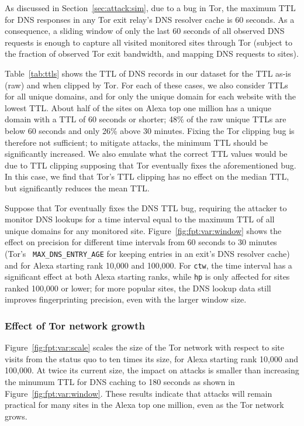 As discussed in Section~\ref{sec:attack:sim}, due to a bug in Tor, the
maximum TTL for DNS responses in any Tor exit relay's DNS resolver cache
is 60 seconds. As a consequence, a sliding window of only the last 60
seconds of all observed DNS requests is enough to capture all visited
monitored sites through Tor (subject to the fraction of observed Tor
exit bandwidth, and mapping DNS requests to sites).

Table~\ref{tab:ttls} shows the TTL of DNS records in our dataset for the
TTL as-is (raw) and when clipped by Tor.  For each of these cases, we
also consider TTLs for all unique domains, and for only the unique
domain for each website with the lowest TTL.  About half of the sites on
Alexa top one million has a unique domain with a TTL of 60 seconds or
shorter; 48\% of the raw unique TTLs are below 60 seconds and only 26\%
above 30 minutes. Fixing the Tor clipping bug is therefore not
sufficient; to mitigate \name attacks, the minimum TTL should be
significantly increased.  We also emulate what the correct TTL values
would be due to TTL clipping supposing that Tor eventually fixes the
aforementioned bug.  In this case, we find that Tor's TTL clipping has
no effect on the median TTL, but significantly reduces the mean TTL.

Suppose that Tor eventually fixes the DNS TTL bug, requiring the
attacker to monitor DNS lookups for a time interval equal to the maximum
TTL of all unique domains for any monitored site.
Figure~\ref{fig:fpt:var:window} shows the effect on precision for
different time intervals from 60 seconds to 30 minutes (Tor's {\tt
  MAX\_DNS\_ENTRY\_AGE} for keeping entries in an exit's DNS resolver
cache) and for Alexa starting rank 10,000 and 100,000. For \texttt{ctw},
the time interval has a significant effect at both Alexa starting ranks,
while \texttt{hp} is only affected for sites ranked 100,000 or lower;
for more popular sites, the DNS lookup data still improves
fingerprinting precision, even with the larger window size.

\subsubsection{Effect of Tor network growth}
Figure~\ref{fig:fpt:var:scale} scales the size of the Tor network with
respect to site
visits from the status quo to ten times its size, for Alexa starting rank 10,000 and
100,000. At twice its current size, the impact on \name attacks is smaller than
increasing the minumum TTL for DNS caching to 180 seconds as shown in
Figure~\ref{fig:fpt:var:window}. These results indicate that \name
attacks will remain
practical for many sites in the Alexa top one million, even as the Tor network grows.

